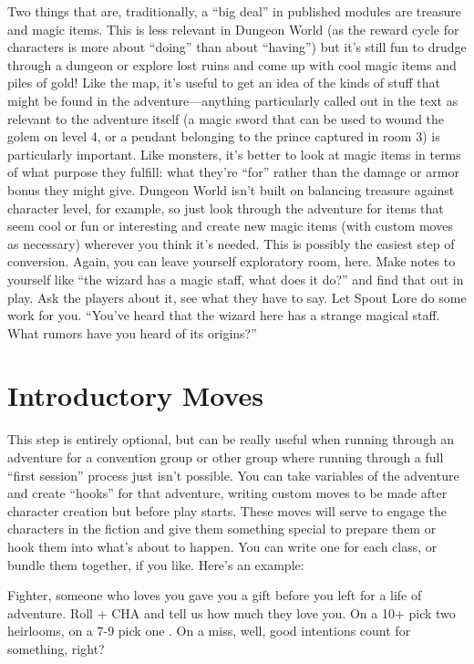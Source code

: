 Two things that are, traditionally, a “big deal” in published modules are treasure and magic items. This is less relevant in Dungeon World (as the reward cycle for characters is more about “doing” than about “having”) but it’s still fun to drudge through a dungeon or explore lost ruins and come up with cool magic items and piles of gold! Like the map, it’s useful to get an idea of the kinds of stuff that might be found in the adventure—anything particularly called out in the text as relevant to the adventure itself (a magic sword that can be used to wound the golem on level 4, or a pendant belonging to the prince captured in room 3) is particularly important. Like monsters, it’s better to look at magic items in terms of what purpose they fulfill: what they’re “for” rather than the damage or armor bonus they might give. Dungeon World isn’t built on balancing treasure against character level, for example, so just look through the adventure for items that seem cool or fun or interesting and create new magic items (with custom moves as necessary) wherever you think it’s needed. This is possibly the easiest step of conversion. Again, you can leave yourself exploratory room, here. Make notes to yourself like “the wizard has a magic staff, what does it do?” and find that out in play. Ask the players about it, see what they have to say. Let Spout Lore do some work for you. “You’ve heard that the wizard here has a strange magical staff. What rumors have you heard of its origins?”

 
\section{Introductory Moves}    
 

This step is entirely optional, but can be really useful when running through an adventure for a convention group or other group where running through a full “first session” process just isn’t possible. You can take variables of the adventure and create “hooks” for that adventure, writing custom moves to be made after character creation but before play starts. These moves will serve to engage the characters in the fiction and give them something special to prepare them or hook them into what’s about to happen. You can write one for each class, or bundle them together, if you like. Here’s an example:

 
\startExample
Fighter, someone who loves you gave you a gift before you left for a life of adventure. Roll + CHA and tell us how much they love you. On a 10+ pick two heirlooms, on a 7-9 pick one . On a miss, well, good intentions count for something, right?
\stopExample
 
